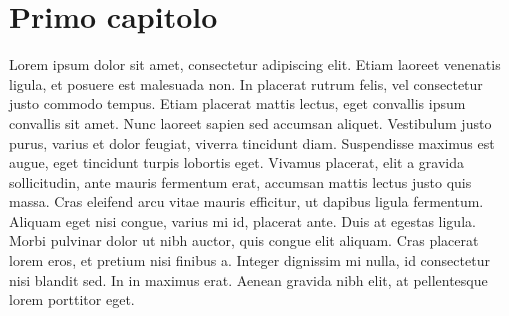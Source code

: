 \chapter{Primo capitolo}

Lorem ipsum dolor sit amet, consectetur adipiscing elit.
Etiam laoreet venenatis ligula, et posuere est malesuada non.
In placerat rutrum felis, vel consectetur justo commodo tempus.
Etiam placerat mattis lectus, eget convallis ipsum convallis
sit amet. Nunc laoreet sapien sed accumsan aliquet. Vestibulum
justo purus, varius et dolor feugiat, viverra tincidunt diam.
Suspendisse maximus est augue, eget tincidunt turpis lobortis
eget. Vivamus placerat, elit a gravida sollicitudin, ante mauris
fermentum erat, accumsan mattis lectus justo quis massa. Cras
eleifend arcu vitae mauris efficitur, ut dapibus ligula fermentum.
Aliquam eget nisi congue, varius mi id, placerat ante. Duis at
egestas ligula. Morbi pulvinar dolor ut nibh auctor, quis congue
elit aliquam. Cras placerat lorem eros, et pretium nisi finibus
a. Integer dignissim mi nulla, id consectetur nisi blandit sed.
In in maximus erat. Aenean gravida nibh elit, at pellentesque
lorem porttitor eget.